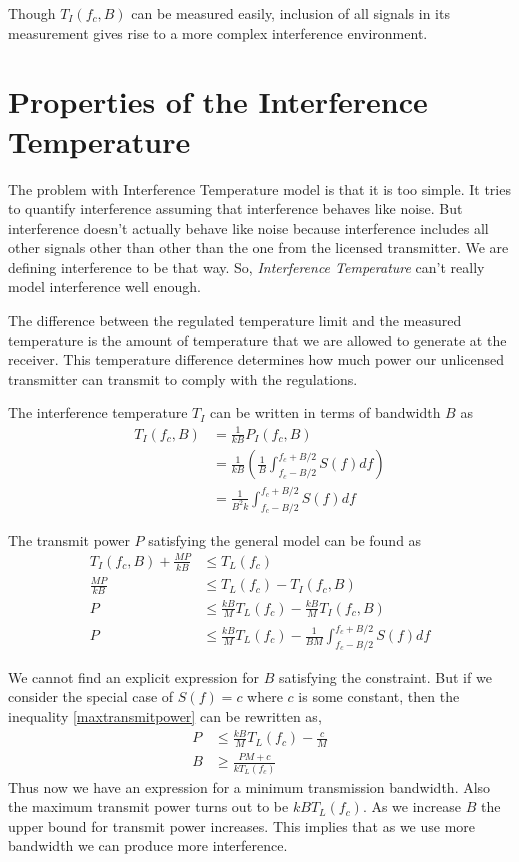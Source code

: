 \documentclass[12pt]{article}
\begin{document}
Though $T_I(f_c,B)$ can be measured easily, inclusion of all signals in its measurement gives rise to a more complex interference environment.


\section{Properties of the Interference Temperature}

The problem with Interference Temperature model is that it is too simple. It tries to quantify interference assuming that interference behaves like noise. But interference doesn't actually behave like noise because interference includes all other signals other than other than the one from the licensed transmitter. We are defining interference to be that way. So, \emph{Interference Temperature} can't really model interference well enough.

The difference between the regulated temperature limit and the measured temperature is the amount of temperature that we are allowed to generate at the receiver. This temperature difference determines how much power our unlicensed transmitter can transmit to comply with the regulations.

The interference temperature $T_I$ can be written in terms of bandwidth $B$ as
\begin{align}
    T_I(f_c,B) & = \frac{1}{kB}P_I(f_c,B) \nonumber\\
    & = \frac{1}{kB}\left(\frac{1}{B}\int_{f_c-B/2}^{f_c+B/2}S(f)df\right) \nonumber\\
    & = \frac{1}{B^2k}\int_{f_c-B/2}^{f_c+B/2}S(f)df
\end{align}

The transmit power $P$ satisfying the general model can be found as
\begin{align}
    T_I(f_c,B) + \frac{MP}{kB} & \leq T_L(f_c) \nonumber \\
    \frac{MP}{kB} & \leq T_L(f_c) - T_I(f_c,B) \nonumber \\
    P & \leq \frac{kB}{M}T_L(f_c) - \frac{kB}{M}T_I(f_c,B) \nonumber \\
    P & \leq \frac{kB}{M}T_L(f_c) - \frac{1}{BM}\int_{f_c-B/2}^{f_c+B/2}S(f)df
    \label{maxtransmitpower}
\end{align}

We cannot find an explicit expression for $B$ satisfying the constraint. But if we consider the special case of $S(f) = c$ where $c$ is some constant, then the inequality \eqref{maxtransmitpower} can be rewritten as,
\begin{align}
    P & \leq \frac{kB}{M}T_L(f_c) - \frac{c}{M} \nonumber\\
    B & \geq \frac{PM + c}{kT_L(f_c)}
\end{align}
Thus now we have an expression for a minimum transmission bandwidth. Also the maximum transmit power turns out to be $kBT_L(f_c)$. As we increase $B$ the upper bound for transmit power increases. This implies that as we use more bandwidth we can produce more interference.
\end{document}

